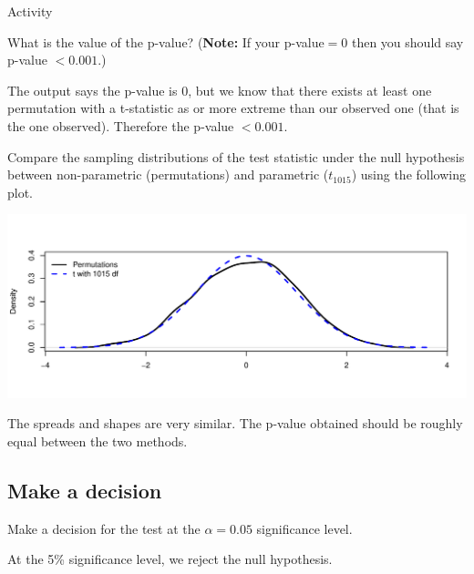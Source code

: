 \documentclass[12pt]{article}\usepackage[]{graphicx}\usepackage[]{color}
\newenvironment{knitrout}{}{} %
\renewenvironment{knitrout}{\begin{footnotesize}}{\end{footnotesize}}
\begin{document}
\begin{exam}{Activity}
\begin{problem*}
\begin{parts}
\item What is the value of the p-value? ({\bf Note:} If your p-value$=0$ then you should say p-value $<0.001$.)
\begin{solution}[0.5cm]
The output says the p-value is 0, but we know that there exists at least one permutation with a t-statistic as or more extreme than our observed one (that is the one observed). Therefore the p-value $<0.001$.
\end{solution}

\item Compare the sampling distributions of the test statistic under the null hypothesis between non-parametric (permutations) and parametric ($t_{1015}$) using the following plot.
\begin{knitrout}\footnotesize
{}\color{fgcolor}

{\centering \includegraphics[width=0.5\linewidth,height=0.3\linewidth]{figure/8-1} 

}



\end{knitrout}
\begin{solution}[2cm]
The spreads and shapes are very similar. The p-value obtained should be roughly equal between the two methods.
\end{solution}
\end{parts}
\end{problem*}



\subsection*{Make a decision}
\begin{problem}
Make a decision for the test at the $\alpha=0.05$ significance level.
\begin{solution}[1cm]
At the 5\% significance level, we reject the null hypothesis.
\end{solution}
\end{problem}



\end{exam}
\end{document}
